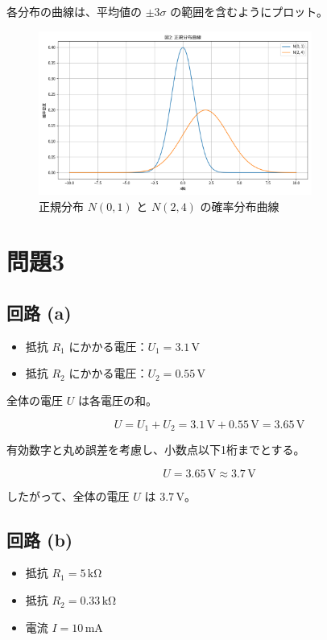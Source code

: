 \documentclass[a4paper,12pt]{article}
\begin{document}
各分布の曲線は、平均値の $\pm3\sigma$ の範囲を含むようにプロット。

\begin{figure}[H]
    \centering
    \includegraphics[width=0.8\textwidth]{Figure_2.png}
    \caption{正規分布 $N(0, 1)$ と $N(2, 4)$ の確率分布曲線}
\end{figure}

\section*{問題3}

\subsection*{回路 (a)}

\begin{itemize}
    \item 抵抗 $R_1$ にかかる電圧：$U_1 = 3.1\,\mathrm{V}$
    \item 抵抗 $R_2$ にかかる電圧：$U_2 = 0.55\,\mathrm{V}$
\end{itemize}

全体の電圧 $U$ は各電圧の和。

\[
U = U_1 + U_2 = 3.1\,\mathrm{V} + 0.55\,\mathrm{V} = 3.65\,\mathrm{V}
\]

有効数字と丸め誤差を考慮し、小数点以下1桁までとする。

\[
U = 3.65\,\mathrm{V} \approx 3.7\,\mathrm{V}
\]

したがって、全体の電圧 $U$ は $3.7\,\mathrm{V}$。

\subsection*{回路 (b)}

\begin{itemize}
    \item 抵抗 $R_1 = 5\,\mathrm{k\Omega}$
    \item 抵抗 $R_2 = 0.33\,\mathrm{k\Omega}$
    \item 電流 $I = 10\,\mathrm{mA}$
\end{itemize}
\end{document}

